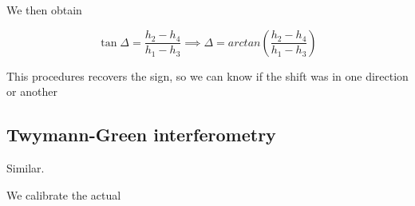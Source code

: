 \documentclass[../main/main.tex]{subfiles}
\begin{document}
We then obtain

\begin{equation}
	\tan \Delta = \frac{h_2 - h_4}{h_1 - h_3} \implies \Delta = arctan\left(\frac{h_2 - h_4}{h_1 - h_3}\right)
\end{equation}

This procedures recovers the sign, so we can know if the shift was in one direction or another


\subsection{Twymann-Green interferometry}

Similar.

We calibrate the actual
\end{document}
